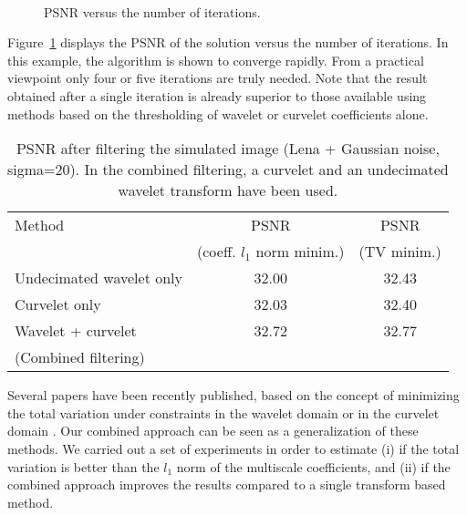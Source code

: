 \begin{figure}[htb]
\centerline{
\hbox{
}}
\caption{PSNR versus the number of iterations.}
\label{fig_iter_cvg}
\end{figure}

Figure~\ref{fig_iter_cvg} displays the PSNR of the solution versus the
number of iterations. In this example, the algorithm is shown to
converge rapidly. From a practical viewpoint only four or five
iterations are truly needed.  Note that the result obtained after a
single iteration is already superior to those available using
methods based on the thresholding of wavelet or curvelet coefficients
alone.

\begin{table*}[htb]
\begin{center}
\begin{tabular}{lcc} \hline \hline
Method                         & PSNR   & PSNR  \\ 
                               & (coeff. $l_1$ norm minim.) & (TV minim.) \\ \hline \hline
 Undecimated wavelet only      & 32.00   &  32.43 \\
 Curvelet only                 & 32.03   &  32.40 \\ 
 Wavelet + curvelet            & 32.72   &  32.77 \\ 
 (Combined filtering)          &         &   \\ \hline \hline
\end{tabular}
\caption{PSNR after filtering the simulated image 
(Lena + Gaussian noise, sigma=20).
In the combined filtering, a curvelet and an undecimated wavelet
transform have been used.}
\vspace{0.5cm}
\label{cur_comptab3}
\end{center}
\end{table*}

Several papers have been recently published, based on the concept
of minimizing the total variation under constraints in the 
wavelet domain \cite{rest:froment01,rest:froment02a,rest:malgouyres02} or in 
the curvelet domain \cite{rest:candes02}. Our combined approach
can be seen as a generalization of these methods.
We carried out a set of experiments in order to estimate (i) if the
total variation is better than the $l_1$ norm of the multiscale
coefficients, and (ii) if the combined approach improves the 
results compared to a single transform based method.

